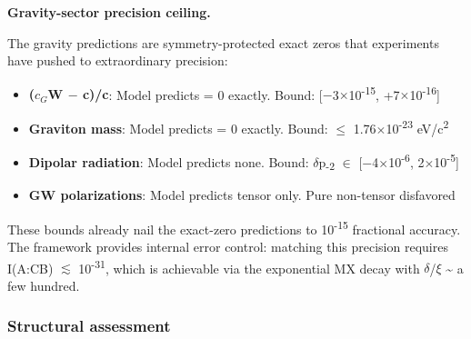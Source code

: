 \documentclass[11pt,a4paper]{article}
\theoremstyle{remark}
\providecommand{\tightlist}{%
  \setlength{\itemsep}{0pt}\setlength{\parskip}{0pt}}
\begin{document}
\textbf{Gravity-sector precision ceiling.}

The gravity predictions are symmetry-protected exact zeros that experiments
have pushed to extraordinary precision:

\begin{itemize}
\tightlist
\item
  \textbf{(\(c_G\)W \ensuremath{-} c)/c}: Model predicts = 0 exactly. Bound: {[}\ensuremath{-}3\ensuremath{\times}10\textsuperscript{-15}, +7\ensuremath{\times}10\textsuperscript{-16}{]}
\item
  \textbf{Graviton mass}: Model predicts = 0 exactly. Bound: \ensuremath{\leq} 1.76\ensuremath{\times}10\textsuperscript{-23} eV/c\textsuperscript{2}
\item
  \textbf{Dipolar radiation}: Model predicts none. Bound: \ensuremath{\delta}p\textsubscript{-2} \ensuremath{\in} {[}\ensuremath{-}4\ensuremath{\times}10\textsuperscript{-6}, 2\ensuremath{\times}10\textsuperscript{-5}{]}
\item
  \textbf{GW polarizations}: Model predicts tensor only. Pure non-tensor disfavored
\end{itemize}

These bounds already nail the exact-zero predictions to 10\textsuperscript{-15} fractional
accuracy. The framework provides internal error control: matching this
precision requires I(A:C\textbar B) \ensuremath{\lesssim} 10\textsuperscript{-31}, which is achievable via the
exponential MX decay with \ensuremath{\delta}/\ensuremath{\xi} \textasciitilde{} a few hundred.

\subsubsection{Structural assessment}\label{structural-assessment}
\end{document}

